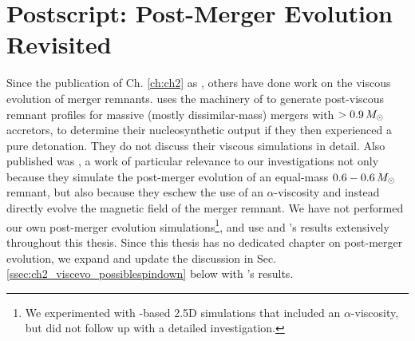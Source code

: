 \section{Postscript: Post-Merger Evolution Revisited}
\label{sec:c2_postscript}

Since the publication of Ch. \ref{ch:ch2} as \citeal{zhu+13}, others have done work on the viscous evolution of merger remnants.  \cite{rask+14} uses the machinery of \cite{schw+12} to generate post-viscous remnant profiles for massive (mostly dissimilar-mass) mergers with $>0.9\,\Msun$ accretors, to determine their nucleosynthetic output if they then experienced a pure detonation.  They do not discuss their viscous simulations in detail.  Also published was \cite{ji+13}, a work of particular relevance to our investigations not only because they simulate the post-merger evolution of an equal-mass $0.6-0.6\,\Msun$ remnant, but also because they eschew the use of an $\alpha$-viscosity and instead directly evolve the magnetic field of the merger remnant.  We have not performed our own post-merger evolution simulations\footnote{We experimented with \flash-based 2.5D simulations that included an $\alpha$-viscosity, but did not follow up with a detailed investigation.}, and use \cite{schw+12} and \cite{ji+13}'s results extensively throughout this thesis.  Since this thesis has no dedicated chapter on post-merger evolution, we expand and update the discussion in Sec. \ref{ssec:ch2_viscevo_possiblespindown} below with \cite{ji+13}'s results.


